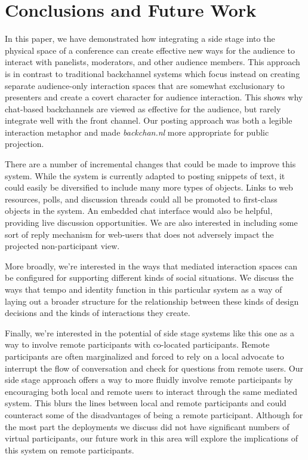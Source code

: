 \section{Conclusions and Future Work}
In this paper, we have demonstrated how integrating a side stage into the physical space of a conference can create effective new ways for the audience to interact with panelists, moderators, and other audience members. This approach is in contrast to traditional backchannel systems which focus instead on creating separate audience-only interaction spaces that are somewhat exclusionary to presenters and create a covert character for audience interaction. This shows why chat-based backchannels are viewed as effective for the audience, but rarely integrate well with the front channel. Our posting approach was both a legible interaction metaphor and made \emph{backchan.nl} more appropriate for public projection.

There are a number of incremental changes that could be made to improve this system. While the system is currently adapted to posting snippets of text, it could easily be diversified to include many more types of objects. Links to web resources, polls, and discussion threads could all be promoted to first-class objects in the system. An embedded chat interface would also be helpful, providing live discussion opportunities. We are also interested in including some sort of reply mechanism for web-users that does not adversely impact the projected non-participant view. 

More broadly, we're interested in the ways that mediated interaction spaces can be configured for supporting different kinds of social situations. We discuss the ways that tempo and identity function in this particular system as a way of laying out a broader structure for the relationship between these kinds of design decisions and the kinds of interactions they create. 

Finally, we're interested in the potential of side stage systems like this one as a way to involve remote participants with co-located participants. Remote participants are often marginalized and forced to rely on a local advocate to interrupt the flow of conversation and check for questions from remote users. Our side stage approach offers a way to more fluidly involve remote participants by encouraging both local and remote users to interact through the same mediated system. This blurs the lines between local and remote participants and could counteract some of the disadvantages of being a remote participant. Although for the most part the deployments we discuss did not have significant numbers of virtual participants, our future work in this area will explore the implications of this system on remote participants.
